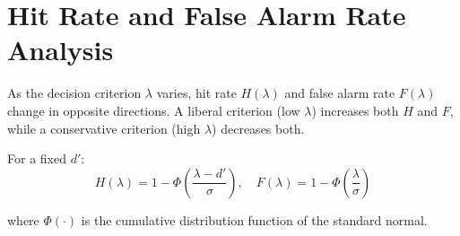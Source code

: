 \documentclass[11pt,a4paper]{article}
\begin{document}
\section{Hit Rate and False Alarm Rate Analysis}

As the decision criterion $\lambda$ varies, hit rate $H(\lambda)$ and false alarm rate $F(\lambda)$ change in opposite directions. A liberal criterion (low $\lambda$) increases both $H$ and $F$, while a conservative criterion (high $\lambda$) decreases both.

For a fixed $d'$:
\begin{equation}
H(\lambda) = 1 - \Phi\left(\frac{\lambda - d'}{\sigma}\right), \quad F(\lambda) = 1 - \Phi\left(\frac{\lambda}{\sigma}\right)
\end{equation}

where $\Phi(\cdot)$ is the cumulative distribution function of the standard normal.
\end{document}
